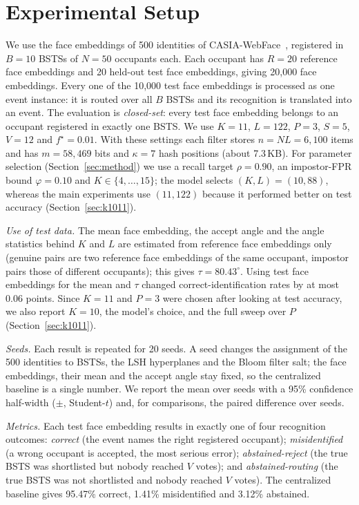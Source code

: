 \documentclass[pdflatex,sn-mathphys-num]{sn-jnl}%
\theoremstyle{thmstyleone}%
\theoremstyle{thmstyletwo}%
\theoremstyle{thmstylethree}%
\begin{document}
\section{Experimental Setup}
\label{sec:setup}

We use the face embeddings of 500 identities of CASIA-WebFace~\cite{yi2014}, registered in $B=10$ BSTSs of $N=50$ occupants each. Each occupant has $R=20$ reference face embeddings and 20 held-out test face embeddings, giving 20,000 face embeddings. Every one of the 10,000 test face embeddings is processed as one event instance: it is routed over all $B$ BSTSs and its recognition is translated into an event. The evaluation is \emph{closed-set}: every test face embedding belongs to an occupant registered in exactly one BSTS. We use $K=11$, $L=122$, $P=3$, $S=5$, $V=12$ and $f^{\star}=0.01$. With these settings each filter stores $n=NL=6{,}100$ items and has $m=58{,}469$ bits and $\kappa=7$ hash positions (about 7.3\,KB). For parameter selection (Section~\ref{sec:method}) we use a recall target $\rho=0.90$, an impostor-FPR bound $\varphi=0.10$ and $K\in\{4,\ldots,15\}$; the model selects $(K,L)=(10,88)$, whereas the main experiments use $(11,122)$ because it performed better on test accuracy (Section~\ref{sec:k1011}).

\emph{Use of test data.} The mean face embedding, the accept angle and the angle statistics behind $K$ and $L$ are estimated from reference face embeddings only (genuine pairs are two reference face embeddings of the same occupant, impostor pairs those of different occupants); this gives $\tau=80.43^{\circ}$. Using test face embeddings for the mean and $\tau$ changed correct-identification rates by at most 0.06 points. Since $K=11$ and $P=3$ were chosen after looking at test accuracy, we also report $K=10$, the model's choice, and the full sweep over $P$ (Section~\ref{sec:k1011}).

\emph{Seeds.} Each result is repeated for 20 seeds. A seed changes the assignment of the 500 identities to BSTSs, the LSH hyperplanes and the Bloom filter salt; the face embeddings, their mean and the accept angle stay fixed, so the centralized baseline is a single number. We report the mean over seeds with a 95\% confidence half-width ($\pm$, Student-$t$) and, for comparisons, the paired difference over seeds.

\emph{Metrics.} Each test face embedding results in exactly one of four recognition outcomes: \emph{correct} (the event names the right registered occupant); \emph{misidentified} (a wrong occupant is accepted, the most serious error); \emph{abstained-reject} (the true BSTS was shortlisted but nobody reached $V$ votes); and \emph{abstained-routing} (the true BSTS was not shortlisted and nobody reached $V$ votes). The centralized baseline gives 95.47\% correct, 1.41\% misidentified and 3.12\% abstained.
\end{document}
